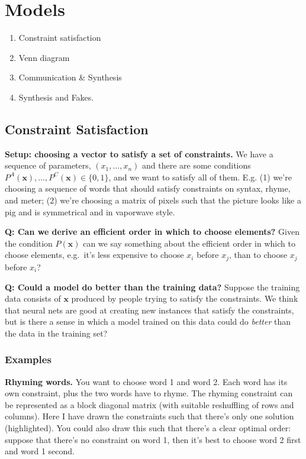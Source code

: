 \documentclass[
  11pt,
  letterpaper,
  DIV=11,
  numbers=noendperiod,
  oneside]{scrartcl}
\providecommand{\tightlist}{%
  \setlength{\itemsep}{0pt}\setlength{\parskip}{0pt}}\usepackage{longtable,booktabs,array}
\begin{document}
\hypertarget{models}{%
\section{Models}\label{models}}

\begin{enumerate}
\def\labelenumi{\arabic{enumi}.}
\tightlist
\item
  Constraint satisfaction
\item
  Venn diagram
\item
  Communication \& Synthesis
\item
  Synthesis and Fakes.
\end{enumerate}

\hypertarget{constraint-satisfaction}{%
\subsection{Constraint Satisfaction}\label{constraint-satisfaction}}

\textbf{Setup: choosing a vector to satisfy a set of constraints.} We
have a sequence of parameters, \((x_1,\ldots,x_n)\) and there are some
conditions \(P^A(\bm{x}),\ldots,P^C(\bm{x})\in\{0,1\}\), and we want to
satisfy all of them. E.g. (1) we're choosing a sequence of words that
should satisfy constraints on syntax, rhyme, and meter; (2) we're
choosing a matrix of pixels such that the picture looks like a pig and
is symmetrical and in vaporwave style.

\textbf{Q: Can we derive an efficient order in which to choose
elements?} Given the condition \(P(\bm{x})\) can we say something about
the efficient order in which to choose elements, e.g.~it's less
expensive to choose \(x_i\) before \(x_j\), than to choose \(x_j\)
before \(x_i\)?

\textbf{Q: Could a model do better than the training data?} Suppose the
training data consists of \(\bm{x}\) produced by people trying to
satisfy the constraints. We think that neural nets are good at creating
new instances that satisfy the constraints, but is there a sense in
which a model trained on this data could do \emph{better} than the data
in the training set?

\hypertarget{examples}{%
\subsubsection{Examples}\label{examples}}

\textbf{Rhyming words.} You want to choose word 1 and word 2. Each word
has its own constraint, plus the two words have to rhyme. The rhyming
constraint can be represented as a block diagonal matrix (with suitable
reshuffling of rows and columns). Here I have drawn the constraints such
that there's only one solution (highlighted). You could also draw this
such that there's a clear optimal order: suppose that there's no
constraint on word 1, then it's best to choose word 2 first and word 1
second.
\end{document}
